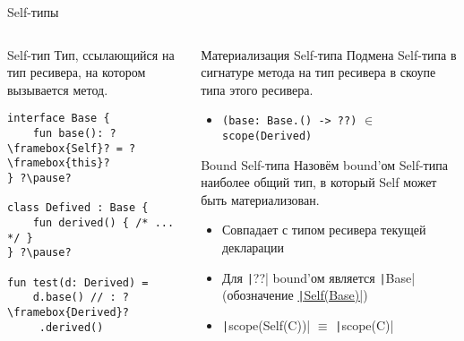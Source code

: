 \documentclass[handout,aspectratio=169,usenames,dvipsnames]{beamer}
\begin{document}
    \begin{frame}[fragile]{Self-типы}
        \begin{columns}[onlytextwidth]
            \begin{column}[t]{0.43\textwidth}
                \begin{block}{Self-тип}
                    Тип, ссылающийся на тип ресивера, на котором вызывается метод.
                    \pause
                    \begin{verbatim}
interface Base {
    fun base(): ?\framebox{Self}? = ?\framebox{this}?
} ?\pause?

class Defived : Base {
    fun derived() { /* ... */ }
} ?\pause?

fun test(d: Derived) =
    d.base() // : ?\framebox{Derived}?
     .derived()
                    \end{verbatim}
                \end{block}
            \end{column}\hfill%
            \begin{column}[t]{0.53\textwidth}
                \pause
                \begin{block}{Материализация Self-типа}
                    Подмена Self-типа в сигнатуре метода на тип ресивера в скоупе типа этого ресивера.
                    \pause
                    \begin{itemize}
                        \item \texttt{(base: Base.() -> ??)} $\in$ \texttt{scope(Derived)}
                    \end{itemize}
                \end{block}
                \pause
                \begin{block}{Bound Self-типа}
                    Назовём bound'ом Self-типа наиболее общий тип, в который Self может быть материализован. \pause \vspace{-1em}
                    \begin{itemize}
                        \item Совпадает с типом ресивера текущей декларации
                        \item Для \texttt|??| bound'ом является \texttt|Base| (обозначение \underline{\texttt|Self(Base)|})
                        \item \texttt|scope(Self(C))| $\equiv$ \texttt|scope(C)|
                    \end{itemize}
                \end{block}
            \end{column}
        \end{columns}
    \end{frame}
\end{document}
